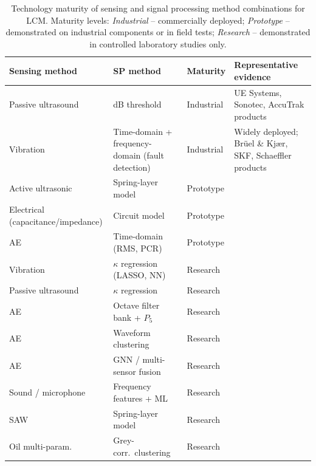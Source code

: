 \begin{table}[H]
\scriptsize
\centering
\renewcommand{\arraystretch}{1.4}
\setlength{\tabcolsep}{4pt}
\begin{tabularx}{\linewidth}{|
>{\raggedright\arraybackslash}p{2.5cm}
| >{\raggedright\arraybackslash}p{3cm}
| >{\centering\arraybackslash}X
| X |}
\hline
\textbf{Sensing method} & \textbf{SP method} & \textbf{Maturity} & \textbf{Representative evidence} \\
\hline
Passive ultrasound & dB threshold & Industrial & UE Systems, Sonotec, AccuTrak products \cite{lineham_ultrasonic_2008} \\
\hline
Vibration & Time-domain + frequency-domain (fault detection) & Industrial & Widely deployed; Brüel \& Kjær, SKF, Schaeffler products \\
\hline
Active ultrasonic & Spring-layer model & Prototype & \cite{dwyer-joyce_measurement_2003,li_lubrication_2026,chen_evaluation_2023} \\
\hline
Electrical (capacitance/impedance) & Circuit model & Prototype & \cite{cen_ehl_2021,becker-dombrowsky_electrical_2024,schneider_method_2022} \\
\hline
AE & Time-domain (RMS, PCR) & Prototype & \cite{cornel_condition_2021,hou_-situ_2025,miettinen_analysis_2001} \\
\hline
Vibration & $\kappa$ regression (LASSO, NN) & Research & \cite{jakobsen_detecting_2023,jakobsen_vibration_2021} \\
\hline
Passive ultrasound & $\kappa$ regression & Research & \cite{jakobsen_detecting_2023,jakobsen_low_2024} \\
\hline
AE & Octave filter bank + $P_5$ & Research & \cite{renhart_monitoring_2021} \\
\hline
AE & Waveform clustering & Research & \cite{scheeren_acoustic_2024} \\
\hline
AE & GNN / multi-sensor fusion & Research & \cite{zhang_graph-data-based_2024} \\
\hline
Sound / microphone & Frequency features + ML & Research & \cite{georgiev_microphone_2017,pacheco-cherrez_bearing_2022} \\
\hline
SAW & Spring-layer model & Research & \cite{tatzgern_tribo-acoustic_2025,lindner_a23_2011} \\
\hline
Oil multi-param. & Grey-corr.\ clustering & Research & \cite{wang_evaluation_2018} \\
\hline
\end{tabularx}
\caption{Technology maturity of sensing and signal processing method combinations for LCM. Maturity levels: \textit{Industrial} -- commercially deployed; \textit{Prototype} -- demonstrated on industrial components or in field tests; \textit{Research} -- demonstrated in controlled laboratory studies only.}
\label{tab:maturity}
\end{table}

